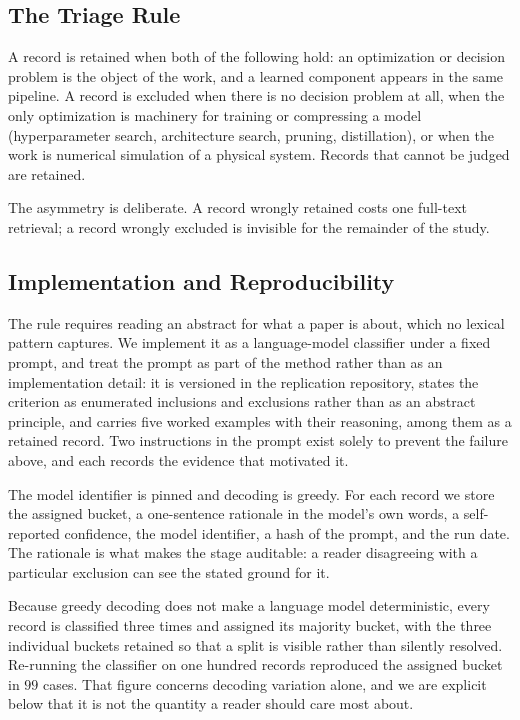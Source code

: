 \subsection{The Triage Rule}

A record is retained when both of the following hold: an optimization or decision problem is the
object of the work, and a learned component appears in the same pipeline. A record is excluded when
there is no decision problem at all, when the only optimization is machinery for training or
compressing a model (hyperparameter search, architecture search, pruning, distillation), or when the
work is numerical simulation of a physical system. Records that cannot be judged are retained.

The asymmetry is deliberate. A record wrongly retained costs one full-text retrieval; a record
wrongly excluded is invisible for the remainder of the study.

\subsection{Implementation and Reproducibility}

The rule requires reading an abstract for what a paper is about, which no lexical pattern captures.
We implement it as a language-model classifier under a fixed prompt, and treat the prompt as part of
the method rather than as an implementation detail: it is versioned in the replication repository,
states the criterion as enumerated inclusions and exclusions rather than as an abstract principle,
and carries five worked examples with their reasoning, among them \citet{berthet2020learning} as a
retained record. Two instructions in the prompt exist solely to prevent the failure above, and each
records the evidence that motivated it.

The model identifier is pinned and decoding is greedy. For each record we store the assigned
bucket, a one-sentence rationale in the model's own words, a self-reported confidence, the model
identifier, a hash of the prompt, and the run date. The rationale is what makes the stage auditable:
a reader disagreeing with a particular exclusion can see the stated ground for it.

Because greedy decoding does not make a language model deterministic, every record is classified
three times and assigned its majority bucket, with the three individual buckets retained so that a
split is visible rather than silently resolved. Re-running the classifier on one hundred records
reproduced the assigned bucket in \(99\) cases. That figure concerns decoding variation alone, and we
are explicit below that it is not the quantity a reader should care most about.

